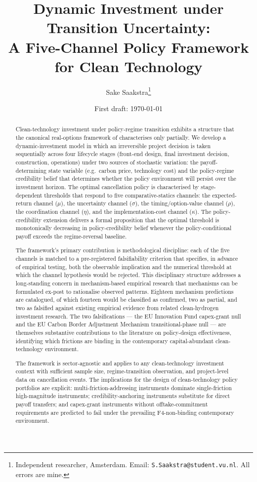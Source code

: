 \documentclass[12pt,a4paper]{article}
\title{Dynamic Investment under Transition Uncertainty: \\ A Five-Channel Policy Framework for Clean Technology}
\author{Sake Saakstra\thanks{Independent researcher, Amsterdam. Email: \texttt{S.Saakstra@student.vu.nl}. All errors are mine.}}
\date{First draft: \today}
\theoremstyle{plain}
\theoremstyle{definition}
\begin{document}
\maketitle

\begin{abstract}
\noindent
Clean-technology investment under policy-regime transition exhibits a structure that the canonical real-options framework of \cite{dixit1994investment} characterises only partially. We develop a dynamic-investment model in which an irreversible project decision is taken sequentially across four lifecycle stages (front-end design, final investment decision, construction, operations) under two sources of stochastic variation: the payoff-determining state variable (e.g.\ carbon price, technology cost) and the policy-regime credibility belief that determines whether the policy environment will persist over the investment horizon. The optimal cancellation policy is characterised by stage-dependent thresholds that respond to five comparative-statics channels: the expected-return channel ($\mu$), the uncertainty channel ($\sigma$), the timing/option-value channel ($\rho$), the coordination channel ($\eta$), and the implementation-cost channel ($\kappa$). The policy-credibility extension delivers a formal proposition that the optimal threshold is monotonically decreasing in policy-credibility belief whenever the policy-conditional payoff exceeds the regime-reversal baseline.

The framework's primary contribution is methodological discipline: each of the five channels is matched to a pre-registered falsifiability criterion that specifies, in advance of empirical testing, both the observable implication and the numerical threshold at which the channel hypothesis would be rejected. This disciplinary structure addresses a long-standing concern in mechanism-based empirical research that mechanisms can be formulated ex-post to rationalise observed patterns. Eighteen mechanism predictions are catalogued, of which fourteen would be classified as confirmed, two as partial, and two as falsified against existing empirical evidence from related clean-hydrogen investment research. The two falsifications --- the EU Innovation Fund capex-grant null and the EU Carbon Border Adjustment Mechanism transitional-phase null --- are themselves substantive contributions to the literature on policy-design effectiveness, identifying which frictions are binding in the contemporary capital-abundant clean-technology environment.

The framework is sector-agnostic and applies to any clean-technology investment context with sufficient sample size, regime-transition observation, and project-level data on cancellation events. The implications for the design of clean-technology policy portfolios are explicit: multi-friction-addressing instruments dominate single-friction high-magnitude instruments; credibility-anchoring instruments substitute for direct payoff transfers; and capex-grant instruments without offtake-commitment requirements are predicted to fail under the prevailing F4-non-binding contemporary environment.


\end{abstract}
\end{document}
